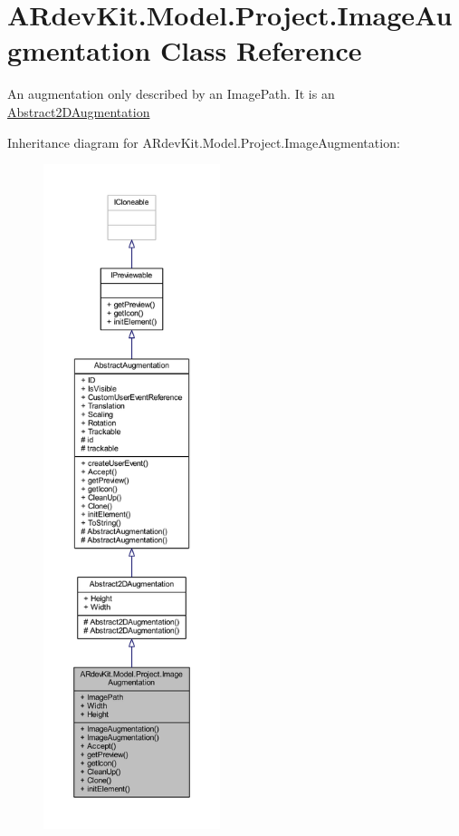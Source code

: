 \hypertarget{class_a_rdev_kit_1_1_model_1_1_project_1_1_image_augmentation}{\section{A\-Rdev\-Kit.\-Model.\-Project.\-Image\-Augmentation Class Reference}
\label{class_a_rdev_kit_1_1_model_1_1_project_1_1_image_augmentation}
}


An augmentation only described by an Image\-Path. It is an \hyperlink{class_a_rdev_kit_1_1_model_1_1_project_1_1_abstract2_d_augmentation}{Abstract2\-D\-Augmentation}  




Inheritance diagram for A\-Rdev\-Kit.\-Model.\-Project.\-Image\-Augmentation\-:
\nopagebreak
\begin{figure}[H]
\begin{center}
\leavevmode
\includegraphics[height=550pt]{class_a_rdev_kit_1_1_model_1_1_project_1_1_image_augmentation__inherit__graph}
\end{center}
\end{figure}


